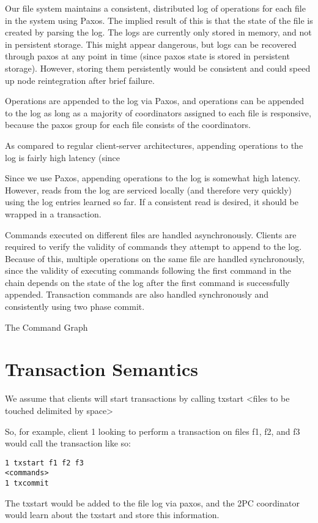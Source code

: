 \documentclass[11pt]{article}
\begin{document}
Our file system maintains a consistent, distributed log of operations for each file in the system using Paxos. The implied result of this is that the state of the file is created by parsing the log.
The logs are currently only stored in memory, and not in persistent storage. This might appear dangerous, but logs can be recovered through paxos at any point in time (since paxos state is stored in persistent storage).  However, storing them persistently would be consistent and could speed up node reintegration after brief failure.

Operations are appended to the log via Paxos, and operations can be appended to the log as long as a majority of coordinators assigned to each file is responsive, because the paxos group for each file consists of the coordinators.

As compared to regular client-server architectures, appending operations to the log is fairly high latency (since 

Since we use Paxos, appending operations to the log is somewhat high latency.
However, reads from the log are serviced locally (and therefore very quickly) using the log entries learned so far.
If a consistent read is desired, it should be wrapped in a transaction.

Commands executed on different files are handled asynchronously.
Clients are required to verify the validity of commands they attempt to append to the log. 
Because of this, multiple operations on the same file are handled synchronously, since the validity of executing commands
following the first command in the chain depends on the state of the log after the first command is successfully appended.
Transaction commands are also handled synchronously and consistently using two phase commit.

The Command Graph

\section{Transaction Semantics}
We assume that clients will start transactions by calling txstart <files to be touched delimited by space>

So, for example, client 1 looking to perform a transaction on files f1, f2, and f3 would call the transaction like so:

\begin{verbatim}
1 txstart f1 f2 f3
<commands>
1 txcommit
\end{verbatim}

The txstart would be added to the file log via paxos, and the 2PC coordinator would learn about the txstart and store this information.
\end{document}
